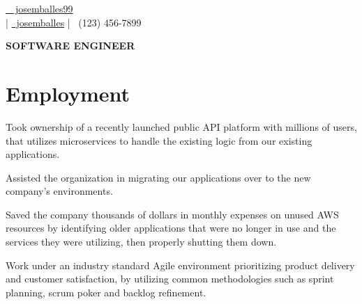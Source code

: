 \documentclass[]{deedy-resume}
\begin{document}
%
%
\lastupdated

%
%


{\href{https://github.com/josemballes99}{\faGithubSquare\ \, josemballes99} \\
\href{mailto: test@test.com}  | \href{https://www.linkedin.com/in/josemballes/}{\faLinkedinSquare \, josemballes}  | {\faMobile \, (123) 456-7899} 
}


\begin{center}
\huge\color{subheadings}\bf{SOFTWARE ENGINEER}
\end{center}

\section{Employment}

\begin{tightemize}
\item Took ownership of a recently launched public API platform with millions of users, that utilizes microservices to handle the existing logic from our existing applications.
\item Assisted the organization in migrating our applications over to the new company's environments.
\item Saved the company thousands of dollars in monthly expenses on unused AWS resources by identifying older applications that were no longer in use and the services they were utilizing, then properly shutting them down. 
\item Work under an industry standard Agile environment prioritizing product delivery and customer satisfaction, by utilizing common methodologies such as sprint planning, scrum poker and backlog refinement.
\end{tightemize}
\sectionsep
\end{document}
